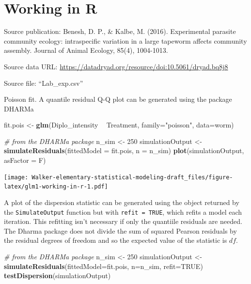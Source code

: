 \documentclass[]{book}
\newenvironment{Shaded}{\begin{snugshade}}{\end{snugshade}}
\newcommand{\KeywordTok}[1]{\textcolor[rgb]{0.13,0.29,0.53}{\textbf{#1}}}
\newcommand{\DataTypeTok}[1]{\textcolor[rgb]{0.13,0.29,0.53}{#1}}
\newcommand{\DecValTok}[1]{\textcolor[rgb]{0.00,0.00,0.81}{#1}}
\newcommand{\StringTok}[1]{\textcolor[rgb]{0.31,0.60,0.02}{#1}}
\newcommand{\CommentTok}[1]{\textcolor[rgb]{0.56,0.35,0.01}{\textit{#1}}}
\newcommand{\OtherTok}[1]{\textcolor[rgb]{0.56,0.35,0.01}{#1}}
\newcommand{\OperatorTok}[1]{\textcolor[rgb]{0.81,0.36,0.00}{\textbf{#1}}}
\newcommand{\NormalTok}[1]{#1}
\begin{document}
\section{Working in R}\label{working-in-r-5}

Source publication: Benesh, D. P., \& Kalbe, M. (2016). Experimental
parasite community ecology: intraspecific variation in a large tapeworm
affects community assembly. Journal of Animal Ecology, 85(4), 1004-1013.

Source data URL:
\url{https://datadryad.org/resource/doi:10.5061/dryad.bq8j8}

Source file: ``Lab\_exp.csv''

Poisson fit. A quantile residual Q-Q plot can be generated using the
package DHARMa

\begin{Shaded}
\begin{Highlighting}[]
\NormalTok{fit.pois <-}\StringTok{ }\KeywordTok{glm}\NormalTok{(Diplo_intensity }\OperatorTok{~}\StringTok{ }\NormalTok{Treatment, }\DataTypeTok{family=}\StringTok{"poisson"}\NormalTok{, }\DataTypeTok{data=}\NormalTok{worm)}

\CommentTok{# from the DHARMa package}
\NormalTok{  n_sim <-}\StringTok{ }\DecValTok{250}
\NormalTok{  simulationOutput <-}\StringTok{ }\KeywordTok{simulateResiduals}\NormalTok{(}\DataTypeTok{fittedModel =}\NormalTok{ fit.pois, }\DataTypeTok{n =}\NormalTok{ n_sim)}
  \KeywordTok{plot}\NormalTok{(simulationOutput, }\DataTypeTok{asFactor =}\NormalTok{ F)}
\end{Highlighting}
\end{Shaded}

\texttt{[image: Walker-elementary-statistical-modeling-draft\_files/figure-latex/glm1-working-in-r-1.pdf]}

A plot of the dispersion statistic can be generated using the object
returned by the \texttt{SimulateOutput} function but with
\texttt{refit\ =\ TRUE}, which refits a model each iteration. This
refitting isn't necessary if only the quantiile residuals are needed.
The Dharma package does not divide the sum of squared Pearson residuals
by the residual degrees of freedom and so the expected value of the
statistic is \(df\).

\begin{Shaded}
\begin{Highlighting}[]
\CommentTok{# from the DHARMa package}
\NormalTok{  n_sim <-}\StringTok{ }\DecValTok{250}
\NormalTok{  simulationOutput <-}\StringTok{ }\KeywordTok{simulateResiduals}\NormalTok{(}\DataTypeTok{fittedModel=}\NormalTok{fit.pois, }\DataTypeTok{n=}\NormalTok{n_sim, }\DataTypeTok{refit=}\OtherTok{TRUE}\NormalTok{)}
  \KeywordTok{testDispersion}\NormalTok{(simulationOutput)}
\end{Highlighting}
\end{Shaded}
\end{document}
